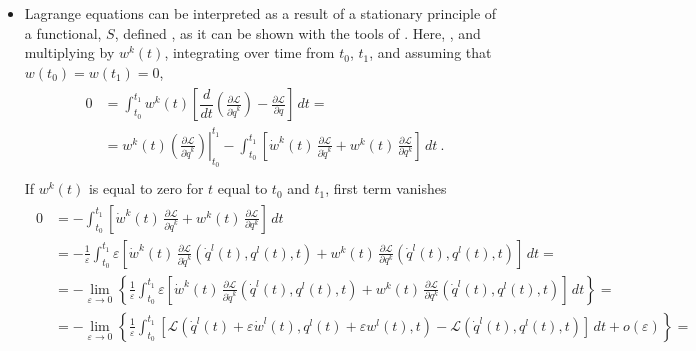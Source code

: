 \documentclass[letterpaper,10pt,english]{jupyterBook}
\begin{document}
\begin{itemize}
\item {} 
\sphinxAtStartPar
Lagrange equations can be interpreted as a result of a stationary principle of a functional, \(S\), defined , as it can be shown with the tools of . Here, , and multiplying by \(w^k(t)\), integrating over time from \(t_0\), \(t_1\), and assuming that \(w(t_0) = w(t_1) = 0\),
\begin{equation*}
\begin{split}\begin{aligned}
     0 & = \int_{t_0}^{t_1} w^k (t) \left[ \dfrac{d}{dt}\left( \frac{\partial \mathscr{L}}{\partial \dot{q}^k} \right) - \frac{\partial \mathscr{L}}{\partial q} \right] \, dt = \\
       & = w^k(t) \left.\left( \frac{\partial \mathscr{L}}{\partial \dot{q}^k} \right)\right|_{t_0}^{t_1} - \int_{t_0}^{t_1} \left[ \dot{w}^k(t) \, \frac{\partial \mathscr{L}}{\partial \dot{q}^k} + w^k(t) \, \frac{\partial \mathscr{L}}{\partial q^k} \right] \, dt \ . \\
   \end{aligned}\end{split}
\end{equation*}
\sphinxAtStartPar
If \(w^k(t)\) is equal to zero for \(t\) equal to \(t_0\) and \(t_1\), first term vanishes
\begin{equation*}
\begin{split}\begin{aligned}
       0 & = - \int_{t_0}^{t_1} \left[ \dot{w}^k(t) \, \frac{\partial \mathscr{L}}{\partial \dot{q}^k} + w^k(t) \, \frac{\partial \mathscr{L}}{\partial q^k} \right] \, dt \\
       & = - \frac{1}{\varepsilon} \int_{t_0}^{t_1} \varepsilon \left[ \dot{w}^k(t) \, \frac{\partial \mathscr{L}}{\partial \dot{q}^k}\left(\dot{q}^l(t), q^l(t), t \right) + w^k(t) \, \frac{\partial \mathscr{L}}{\partial q^k}\left(\dot{q}^l(t), q^l(t), t \right) \right] \, dt = \\
       & = - \lim_{\varepsilon \rightarrow 0} \left\{ \frac{1}{\varepsilon} \int_{t_0}^{t_1} \varepsilon \left[ \dot{w}^k(t) \, \frac{\partial \mathscr{L}}{\partial \dot{q}^k}\left(\dot{q}^l(t), q^l(t), t \right) + w^k(t) \, \frac{\partial \mathscr{L}}{\partial q^k}\left(\dot{q}^l(t), q^l(t), t \right) \right] \, dt \right\}= \\
       & = - \lim_{\varepsilon \rightarrow 0} \left\{ \frac{1}{\varepsilon} \int_{t_0}^{t_1} \left[ \mathscr{L}\left(\dot{q}^l(t)+\varepsilon \dot{w}^l(t), q^l(t) + \varepsilon w^l(t), t \right) - \mathscr{L}\left(\dot{q}^l(t), q^l(t), t \right) \right] \, dt + o(\varepsilon) \right\}= \\

\end{aligned}
\end{split}
\end{equation*}
\end{itemize}
\end{document}
